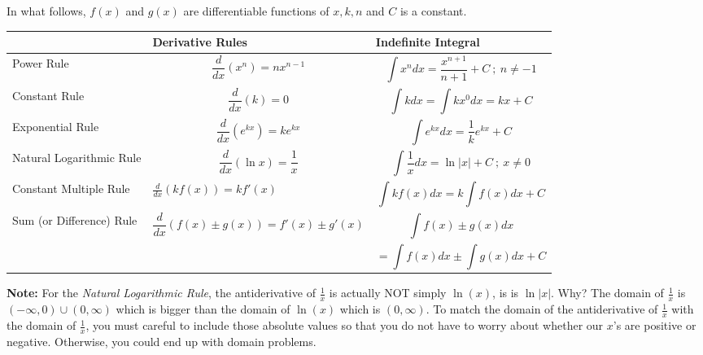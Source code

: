 \noindent In what follows, $f(x)$ and $g(x)$ are differentiable functions of $x, k, n$ and $C$ is a constant.
\vspace{-0.4cm}
\begin{center}
\begin{tabular}{ | m{4cm} | m{5cm}| m{6cm} | } 
\hline
 & Derivative Rules & Indefinite Integral \\ 
\hline

Power Rule & $$\frac{d}{dx}(x^n)=nx^{n-1}$$ & $$\int x^n dx=\frac{x^{n+1}}{n+1}+C \ ; \ n\ne -1$$ \\ 

\hline

Constant Rule & $$\frac{d}{dx}(k)=0$$ & $$\int k dx=\int kx^{0} dx=kx+C$$  \\ 

\hline

Exponential Rule & $$\frac{d}{dx}(e^{kx})=ke^{kx}$$ & $$\int e^{kx} dx=\frac{1}{k}e^{kx}+C$$  \\ 

\hline
Natural Logarithmic Rule & $$\frac{d}{dx}(\ln x)=\frac{1}{x}$$ & $$\int \frac{1}{x} dx=\ln|x|+C \ ;\ x\ne 0 $$  \\ 

\hline

Constant Multiple Rule & $\displaystyle\frac{d}{dx}(kf(x))=kf'(x)$ & $$\int kf(x) dx=k\int f(x) dx+C$$ \\ 

\hline
Sum (or Difference) Rule & $$\frac{d}{dx}(f(x)\pm g(x))=f'(x)\pm g'(x)$$ & $$\int f(x)\pm g(x) dx$$ \\ 
 & & $$=\int f(x) dx \pm \int g(x) dx+C$$\\
 \hline
\end{tabular}
\end{center}
\noindent \textbf{Note:} For the \emph{Natural Logarithmic Rule}, the antiderivative of $\displaystyle\frac{1}{x}$ is actually NOT simply $\ln(x)$, is is $\ln|x|$. Why? The domain of $\displaystyle\frac{1}{x}$ is $(-\infty,0)\cup (0,\infty)$ which is bigger than the domain of $\ln(x)$ which is $(0,\infty)$. To match the domain of the antiderivative of $\displaystyle\frac{1}{x}$ with the domain of $\displaystyle\frac{1}{x}$, you must careful to include those absolute values so that you do not have to worry about whether our $x$'s are positive or negative. Otherwise, you could end up with domain problems.\\
